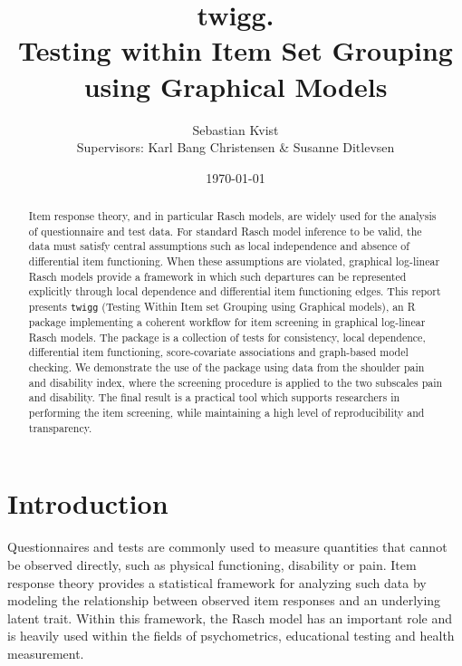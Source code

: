 \documentclass[a4project,12pt]{article}
\title{twigg. \\
Testing within Item Set Grouping using Graphical Models}
\author{Sebastian Kvist \\
Supervisors: Karl Bang Christensen \& Susanne Ditlevsen}
\date{\today}
\theoremstyle{examplestyle}
\theoremstyle{defstyle}
\theoremstyle{thmstyle}
\begin{document}
\maketitle

\tableofcontents

\newpage  
\begin{abstract}
Item response theory, and in particular Rasch models, are widely used for the analysis of questionnaire and test data. For standard Rasch model inference to be valid, the data must satisfy central assumptions such as local independence and absence of differential item functioning. When these assumptions are violated, graphical log-linear Rasch models provide a framework in which such departures can be represented explicitly through local dependence and differential item functioning edges. This report presents \texttt{twigg} (Testing Within Item set Grouping using Graphical models), an R package implementing a coherent workflow for item screening in graphical log-linear Rasch models. The package is a collection of tests for consistency, local dependence, differential item functioning, score-covariate associations and graph-based model checking. We demonstrate the use of the package using data from the shoulder pain and disability index, where the screening procedure is applied to the two subscales pain and disability. The final result is a practical tool which supports researchers in performing the item screening, while maintaining a high level of reproducibility and transparency.
\end{abstract}


\newpage

\section{Introduction}

Questionnaires and tests are commonly used to measure quantities that cannot be observed directly, such as physical functioning, disability or pain. Item response theory provides a statistical framework for analyzing such data by modeling the relationship between observed item responses and an underlying latent trait. Within this framework, the Rasch model has an important role and is heavily used within the fields of psychometrics, educational testing and health measurement.
\end{document}
